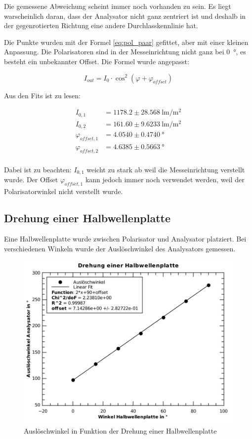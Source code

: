 Die  gemessene  Abweichung  scheint  immer  noch  vorhanden  zu  sein.  Es liegt
warscheinlich daran, dass der Analysator nicht ganz zentriert ist und deshalb in
der gegenrotierten Richtung eine andere Durchlasskennlinie hat.

Die Punkte wurden mit der  Formel  \ref{eq:pol_paar}  gefittet,  aber  mit einer
kleinen Anpassung. Die Polarisatoren sind in der Messeinrichtung nicht ganz  bei
\SI{0}{\degree}, es besteht ein unbekannter Offset. Die Formel wurde angepasst:

\begin{equation}
    I_{out} = I_0\cdot\cos^2(\varphi + \varphi_{offset})
\end{equation}

Aus den Fits ist zu lesen:

\begin{align*}
    I_{0,1}            &= 1178.2 \pm 28.568\SI{}{\lumen\per\square\meter} \\
    I_{0,2}            &= 161.60 \pm 9.6233\SI{}{\lumen\per\square\meter} \\
    \varphi_{offset,1} &= 4.0540 \pm 0.4740\SI{}{\degree} \\
    \varphi_{offset,2} &= 4.6385 \pm 0.5663\SI{}{\degree} \\
\end{align*}

Dabei ist zu beachten: $I_{0,1}$ weicht zu stark  ab  weil  die  Messeinrichtung
verstellt  wurde.   Der  Offset  $\varphi_{offset,1}$  kann  jedoch  immer  noch
verwendet   werden,   weil   der   Polarisatorwinkel   nicht  verstellt   wurde.


\subsection{Drehung einer Halbwellenplatte}

Eine Halbwellenplatte wurde zwischen Polarisator und  Analysator  platziert. Bei
verschiedenen Winkeln  wurde  der  Ausl\"oschwinkel  des  Analysators  gemessen.

\begin{figure}[H]
    \centering
    \includegraphics[width=.6\linewidth]{images/aufgabe-4.pdf}
    \caption{Auslöschwinkel in Funktion der Drehung einer Halbwellenplatte}
\end{figure}

